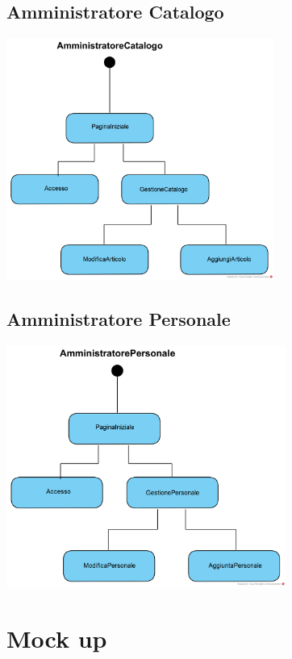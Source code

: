 \documentclass[12pt,a4paper]{article}
\begin{document}
\subsection{Amministratore Catalogo}
\begin{center}
\includegraphics[height=300px]{NavigationalPath/AmministratoreCatalogo}
\end{center}

\subsection{Amministratore Personale}
\begin{center}
\includegraphics[height=300px]{NavigationalPath/AmministratorePersonale}
\end{center}

\newpage
\section{Mock up}
\end{document}
